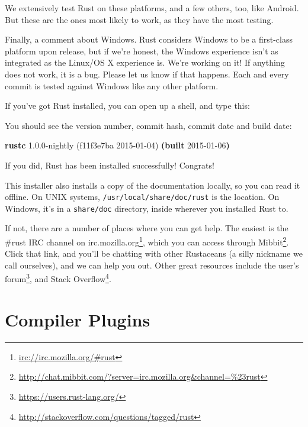 \documentclass[a4paper,]{book}
\renewcommand*{\hypertarget}[3][\ar]{%
  \def\ar{#2}%
  \label{#1}%
  #3}
\newenvironment{Shaded}{\begin{snugshade}}{\end{snugshade}}
\newcommand{\KeywordTok}[1]{\textcolor[rgb]{0.13,0.29,0.53}{\textbf{{#1}}}}
\newcommand{\NormalTok}[1]{{#1}}
\renewcommand{\href}[2]{#2\footnote{\url{#1}}}
\begin{document}
We extensively test Rust on these platforms, and a few others, too, like
Android. But these are the ones most likely to work, as they have the
most testing.

Finally, a comment about Windows. Rust considers Windows to be a
first-class platform upon release, but if we're honest, the Windows
experience isn't as integrated as the Linux/OS X experience is. We're
working on it! If anything does not work, it is a bug. Please let us
know if that happens. Each and every commit is tested against Windows
like any other platform.

If you've got Rust installed, you can open up a shell, and type this:

\begin{Shaded}
\end{Shaded}

You should see the version number, commit hash, commit date and build
date:

\begin{Shaded}
\begin{Highlighting}[]
\KeywordTok{rustc} \NormalTok{1.0.0-nightly (f11f3e7ba 2015-01-04) }\KeywordTok{(built} \NormalTok{2015-01-06}\KeywordTok{)}
\end{Highlighting}
\end{Shaded}

If you did, Rust has been installed successfully! Congrats!

This installer also installs a copy of the documentation locally, so you
can read it offline. On UNIX systems, \texttt{/usr/local/share/doc/rust}
is the location. On Windows, it's in a \texttt{share/doc} directory,
inside wherever you installed Rust to.

If not, there are a number of places where you can get help. The easiest
is \href{irc://irc.mozilla.org/\#rust}{the \#rust IRC channel on
irc.mozilla.org}, which you can access through
\href{http://chat.mibbit.com/?server=irc.mozilla.org\&channel=\%23rust}{Mibbit}.
Click that link, and you'll be chatting with other Rustaceans (a silly
nickname we call ourselves), and we can help you out. Other great
resources include \href{https://users.rust-lang.org/}{the user's forum},
and \href{http://stackoverflow.com/questions/tagged/rust}{Stack
Overflow}.

\hypertarget{sec--compiler-plugins}{\section{Compiler
Plugins}\label{sec--compiler-plugins}}
\end{document}
